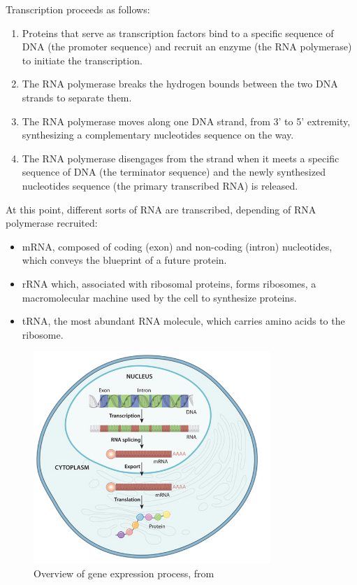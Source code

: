 \noindent
Transcription proceeds as follows:
\begin{enumerate}
	\setlength\itemsep{0.1em}
	\item Proteins that serve as transcription factors bind to a specific sequence of \ac{DNA} (the promoter sequence) and recruit an enzyme (the \ac{RNA} polymerase) to initiate the transcription.
	\item The \ac{RNA} polymerase breaks the hydrogen bounds between the two \ac{DNA} strands to separate them.
	\item The \ac{RNA} polymerase moves along one \ac{DNA} strand, from 3' to 5' extremity, synthesizing a complementary nucleotides sequence on the way.
	\item The \ac{RNA} polymerase disengages from the strand when it meets a specific sequence of \ac{DNA} (the terminator sequence) and the newly synthesized nucleotides sequence (the primary transcribed \ac{RNA}) is released.
\end{enumerate}

\noindent
At this point, different sorts of \ac{RNA} are transcribed, depending of \ac{RNA} polymerase recruited:
\begin{itemize}
	\setlength\itemsep{0.1em}
	\item \ac{mRNA}, composed of coding (exon) and non-coding (intron) nucleotides, which conveys the blueprint of a future protein.
	\item \ac{rRNA} which, associated with ribosomal proteins, forms ribosomes, a macromolecular machine used by the cell to synthesize proteins.
	\item \ac{tRNA}, the most abundant \ac{RNA} molecule, which carries amino acids to the ribosome.
\end{itemize}

\begin{figure}[]
    \centering
    \includegraphics[width=0.8\textwidth]{figures/introduction/gene_expression_process.jpg}
    \caption[Schema of gene expression process]{Overview of gene expression process, from~\cite{cell_essential_nature}}
    \label{fig:gene_expression}
\end{figure}

